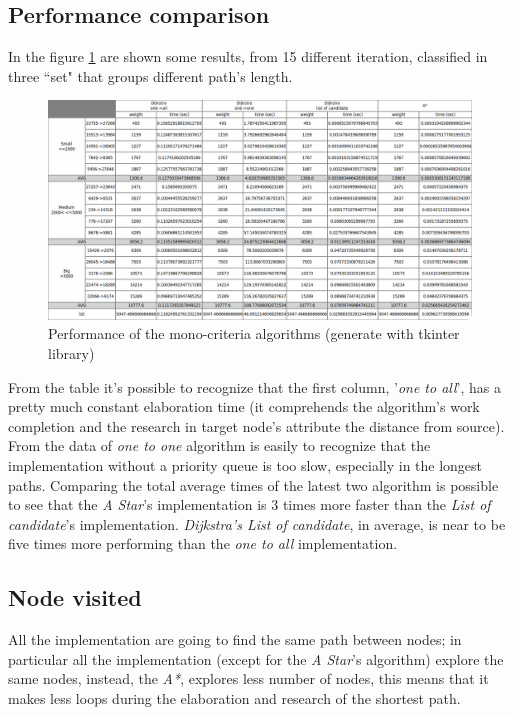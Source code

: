 \documentclass[a4paper,11pt]{report}
\begin{document}
\subsection{Performance comparison} 
In the figure \ref{fig:monoCriteriaOutput} are shown some results, from 15 different iteration, classified in three ``set" that groups different path's length.
\begin{figure}[H]
	\centering
	\includegraphics[width=\linewidth]{monoCriteriaOutput.png}
	\caption{Performance of the mono-criteria algorithms (generate with tkinter library)}
	\label{fig:monoCriteriaOutput}
\end{figure}
From the table it's possible to recognize that the first column, '\textit{one to all}', has a pretty much constant elaboration time (it comprehends the algorithm's work completion and the research in target node's attribute the distance from source). From the data of \textit{one to one} algorithm is easily to recognize that the implementation without a priority queue is too slow, especially in the longest paths. Comparing the total average times of the latest two algorithm is possible to see that the \textit{A Star}'s implementation is 3 times more faster than the \textit{List of candidate}'s implementation.
\textit{Dijkstra's List of candidate}, in average, is near to be five times more performing than the \textit{one to all} implementation.

\subsection{Node visited}

All the implementation are going to find the same path between nodes; in particular all the implementation (except for the \textit{A Star}'s algorithm) explore the same nodes, instead, the \textit{A*}, explores less number of nodes, this means that it makes less loops during the elaboration and research of the shortest path.
\end{document}
